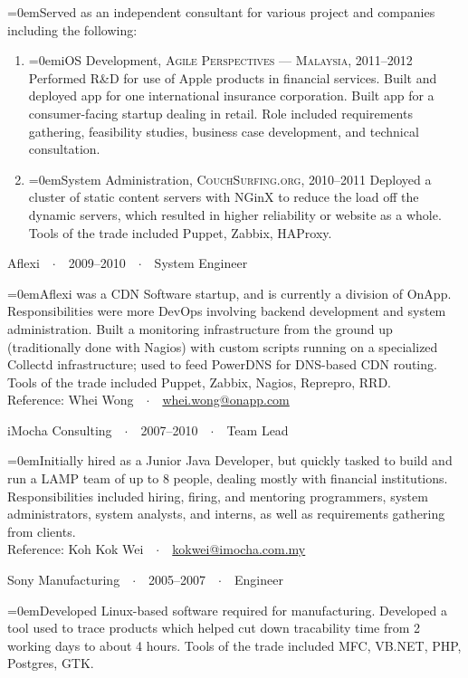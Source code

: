 \documentclass[a4paper]{scrartcl}
\newcommand{\Description}[1]{\hangindent=0em\hangafter=0\noindent\footnotesize{#1}\par\normalsize\vspace{1em}} %
\newcommand{\Redvline}[0]{\vspace{0em}\noindent{\color{ThemeColor}\rule{18cm}{0.4pt}}\vspace{-0.5em}}
\newcommand{\NewBlock}[3]{
    #1\ \ $\cdotp$\ \ #2\ \ $\cdotp$\ \ #3}
\begin{document}
\Description{Served as an independent consultant for various project and companies including the following:}
\begin{enumerate}
\item[] \Description{iOS Development, \textsc{Agile Perspectives --- Malaysia}, 2011--2012
\newline
Performed R\&D for use of Apple products in financial services. Built and deployed app for one international insurance corporation. Built app for a consumer-facing startup dealing in retail. Role included requirements gathering, feasibility studies, business case development, and technical consultation. }

\item[] \Description{System Administration, \textsc{CouchSurfing.org}, 2010--2011
\newline
Deployed a cluster of static content servers with NGinX to reduce the load off the dynamic servers, which resulted in higher reliability or website as a whole. Tools of the trade included Puppet, Zabbix, HAProxy. }
\end{enumerate}

\NewBlock{Aflexi}{2009--2010}{System Engineer}

\Description{Aflexi was a CDN Software startup, and is currently a division of OnApp. Responsibilities were more DevOps involving backend development and system administration. Built a monitoring infrastructure from the ground up (traditionally done with Nagios) with custom scripts running on a specialized Collectd infrastructure; used to feed PowerDNS for DNS-based CDN routing. Tools of the trade included Puppet, Zabbix, Nagios, Reprepro, RRD.
\\Reference: Whei Wong\ \ $\cdotp$\ \ \href{mailto:whei.wong@onapp.com}{whei.wong@onapp.com}}


\NewBlock{iMocha Consulting}{2007--2010}{Team Lead}

\Description{Initially hired as a Junior Java Developer, but quickly tasked to build and run a LAMP team of up to 8 people, dealing mostly with financial institutions. Responsibilities included hiring, firing, and mentoring programmers, system administrators, system analysts, and interns, as well as requirements gathering from clients.
\\Reference: Koh Kok Wei\ \ $\cdotp$\ \ \href{mailto:kokwei@imocha.com.my}{kokwei@imocha.com.my}}

\NewBlock{Sony Manufacturing}{2005--2007}{Engineer}

\Description{Developed Linux-based software required for manufacturing. Developed a tool used to trace products which helped cut down tracability time from 2 working days to about 4 hours. Tools of the trade included MFC, VB.NET, PHP, Postgres, GTK.}
\Redvline
\end{document}
